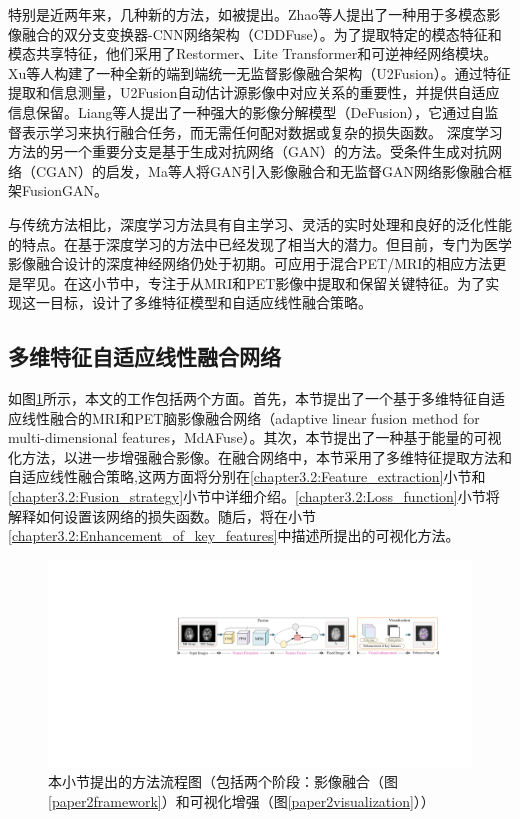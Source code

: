 特别是近两年来，几种新的方法，如\cite{Zhao_2023_CVPR,XuTPAMI2022,LiangECCV2022}被提出。Zhao等人\cite{Zhao_2023_CVPR}提出了一种用于多模态影像融合的双分支变换器-CNN网络架构（CDDFuse）。为了提取特定的模态特征和模态共享特征，他们采用了Restormer、Lite Transformer和可逆神经网络模块。Xu等人\cite{XuTPAMI2022}构建了一种全新的端到端统一无监督影像融合架构（U2Fusion）。通过特征提取和信息测量，U2Fusion自动估计源影像中对应关系的重要性，并提供自适应信息保留。Liang等人\cite{LiangECCV2022}提出了一种强大的影像分解模型（DeFusion），它通过自监督表示学习来执行融合任务，而无需任何配对数据或复杂的损失函数。
深度学习方法的另一个重要分支是基于生成对抗网络（GAN）的方法\cite{xu2020mef,li2020attentionfgan}。受条件生成对抗网络（CGAN）的启发，Ma等人\cite{2019FusionGAN}将GAN引入影像融合和无监督GAN网络影像融合框架FusionGAN。

与传统方法相比，深度学习方法具有自主学习、灵活的实时处理和良好的泛化性能的特点。在基于深度学习的方法中已经发现了相当大的潜力。但目前，专门为医学影像融合设计的深度神经网络仍处于初期。可应用于混合PET/MRI的相应方法更是罕见。在这小节中，专注于从MRI和PET影像中提取和保留关键特征。为了实现这一目标，设计了多维特征模型和自适应线性融合策略。
        
\subsection{多维特征自适应线性融合网络}
如图\ref{paper2flowchart}所示，本文的工作包括两个方面。首先，本节提出了一个基于多维特征自适应线性融合的MRI和PET脑影像融合网络（adaptive linear
fusion method for multi-dimensional features，MdAFuse）。其次，本节提出了一种基于能量的可视化方法，以进一步增强融合影像。在融合网络中，本节采用了多维特征提取方法和自适应线性融合策略,这两方面将分别在\ref{chapter3.2:Feature_extraction}小节和\ref{chapter3.2:Fusion_strategy}小节中详细介绍。\ref{chapter3.2:Loss_function}小节将解释如何设置该网络的损失函数。随后，将在小节\ref{chapter3.2:Enhancement_of_key_features}中描述所提出的可视化方法。
    
\begin{figure}[ht]
      \centering
      \includegraphics[width=0.97\linewidth]{figs/paper2Outline20230723.pdf}
      \caption{本小节提出的方法流程图（包括两个阶段：影像融合（图\ref{paper2framework}）和可视化增强（图\ref{paper2visualization}））}\label{paper2flowchart}
    \end{figure}

